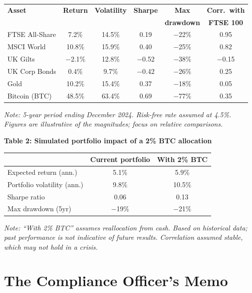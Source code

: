 \documentclass[11pt]{article}
\begin{document}
\begin{center}
\small
\begin{tabular}{lccccc}
\toprule
\textbf{Asset} & \textbf{Return} & \textbf{Volatility} & \textbf{Sharpe} & \textbf{Max} & \textbf{Corr.\ with} \\
 & & & & \textbf{drawdown} & \textbf{FTSE 100} \\
\midrule
FTSE All-Share & 7.2\% & 14.5\% & 0.19 & $-$22\% & 0.95 \\
MSCI World & 10.8\% & 15.9\% & 0.40 & $-$25\% & 0.82 \\
UK Gilts & $-$2.1\% & 12.8\% & $-$0.52 & $-$38\% & $-$0.15 \\
UK Corp Bonds & 0.4\% & 9.7\% & $-$0.42 & $-$26\% & 0.25 \\
Gold & 10.2\% & 15.4\% & 0.37 & $-$18\% & 0.05 \\
Bitcoin (BTC) & 48.5\% & 63.4\% & 0.69 & $-$77\% & 0.35 \\
\bottomrule
\end{tabular}
\end{center}

\smallskip
\noindent\textit{Note: 5-year period ending December 2024. Risk-free rate assumed at 4.5\%. Figures are illustrative of the magnitudes; focus on relative comparisons.}

\medskip
\noindent\textbf{Table 2: Simulated portfolio impact of a 2\% BTC allocation}

\begin{center}
\small
\begin{tabular}{lcc}
\toprule
& \textbf{Current portfolio} & \textbf{With 2\% BTC} \\
\midrule
Expected return (ann.) & 5.1\% & 5.9\% \\
Portfolio volatility (ann.) & 9.8\% & 10.5\% \\
Sharpe ratio & 0.06 & 0.13 \\
Max drawdown (5yr) & $-$19\% & $-$21\% \\
\bottomrule
\end{tabular}
\end{center}

\smallskip
\noindent\textit{Note: ``With 2\% BTC'' assumes reallocation from cash. Based on historical data; past performance is not indicative of future results. Correlation assumed stable, which may not hold in a crisis.}

\section*{The Compliance Officer's Memo}
\end{document}
